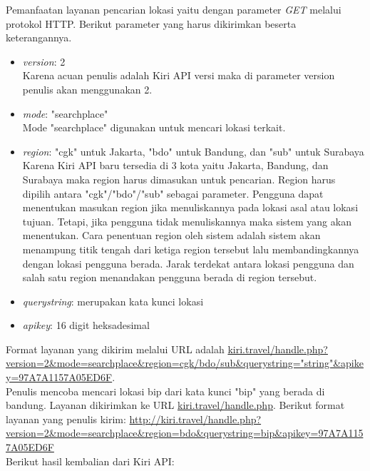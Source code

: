 Pemanfaatan layanan pencarian lokasi yaitu dengan parameter \textit{GET} melalui protokol HTTP. Berikut parameter yang harus dikirimkan beserta keterangannya.
\begin{itemize}
	\item \textit{version}: 2 \\
	Karena acuan penulis adalah Kiri API versi maka di parameter version penulis akan menggunakan 2.
	\item \textit{mode}: "searchplace" \\
	Mode "searchplace" digunakan untuk mencari lokasi terkait.
	\item \textit{region}: "cgk" untuk Jakarta, "bdo" untuk Bandung, dan "sub" untuk Surabaya \\
	Karena Kiri API baru tersedia di 3 kota yaitu Jakarta, Bandung, dan Surabaya maka region harus dimasukan untuk pencarian. Region harus dipilih antara "cgk"/"bdo"/"sub" sebagai parameter. Pengguna dapat menentukan masukan region jika menuliskannya pada lokasi asal atau lokasi tujuan. Tetapi, jika pengguna tidak menuliskannya maka sistem yang akan menentukan. Cara penentuan region oleh sistem adalah sistem akan menampung titik tengah dari ketiga region tersebut lalu membandingkannya dengan lokasi pengguna berada. Jarak terdekat antara lokasi pengguna dan salah satu region menandakan pengguna berada di region tersebut.
	\item \textit{querystring}: merupakan kata kunci lokasi 
	\item \textit{apikey}: 16 digit heksadesimal
\end{itemize}
Format layanan yang dikirim melalui URL adalah \url{kiri.travel/handle.php?version=2&mode=searchplace&region=cgk/bdo/sub&querystring="string"&apikey=97A7A1157A05ED6F}.
\newline
\\Penulis mencoba mencari lokasi bip dari kata kunci "bip" yang berada di bandung. Layanan dikirimkan ke URL \url{kiri.travel/handle.php}. 
Berikut format layanan yang penulis kirim:\newline
{\url{http://kiri.travel/handle.php?version=2&mode=searchplace&region=bdo&querystring=bip&apikey=97A7A1157A05ED6F}}
\newline
\\Berikut hasil kembalian dari Kiri API: 

